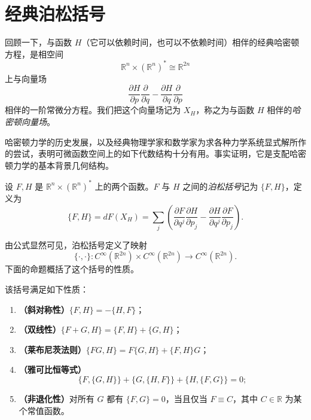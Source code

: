 \section{经典泊松括号}
\label{sec:classical-poisson-brackets}

回顾一下，与函数 $H$（它可以依赖时间，也可以不依赖时间）相伴的经典哈密顿方程，是相空间
\[
  \mathbb R^n\times(\mathbb R^n)^*\cong\mathbb R^{2n}
\]
上与向量场
\[
  \frac{\partial H}{\partial p}\frac{\partial}{\partial q}
  -\frac{\partial H}{\partial q}\frac{\partial}{\partial p}
\]
相伴的一阶常微分方程。我们把这个向量场记为 $X_H$，称之为与函数 $H$ 相伴的\emph{哈密顿向量场}。

哈密顿力学的历史发展，以及经典物理学家和数学家为求各种力学系统显式解所作的尝试，表明可微函数空间上的如下代数结构十分有用。事实证明，它是支配哈密顿力学的基本背景几何结构。

\begin{definition}[经典泊松括号]
\label{def:classical-poisson-bracket}
设 $F,H$ 是 $\mathbb R^n\times(\mathbb R^n)^*$ 上的两个函数。$F$ 与 $H$ 之间的\emph{泊松括号}记为 $\{F,H\}$，定义为
\begin{equation}\label{eq:classical-poisson-bracket}
  \{F,H\}=dF(X_H)
  =\sum_j\left(
    \frac{\partial F}{\partial q^j}\frac{\partial H}{\partial p_j}
    -\frac{\partial H}{\partial q^j}\frac{\partial F}{\partial p_j}
  \right).
\end{equation}
\end{definition}

由公式显然可见，泊松括号定义了映射
\[
  \{\cdot,\cdot\}:C^\infty(\mathbb R^{2n})\times C^\infty(\mathbb R^{2n})
  \longrightarrow C^\infty(\mathbb R^{2n}).
\]
下面的命题概括了这个括号的性质。

\begin{proposition}
\label{prop:poisson-bracket-properties}
该括号满足如下性质：
\begin{enumerate}[label=(\arabic*)]
  \item \textup{\bfseries（斜对称性）}$\{F,H\}=-\{H,F\}$；
  \item \textup{\bfseries（双线性）}$\{F+G,H\}=\{F,H\}+\{G,H\}$；
  \item \textup{\bfseries（莱布尼茨法则）}$\{FG,H\}=F\{G,H\}+\{F,H\}G$；
  \item \textup{\bfseries（雅可比恒等式）}
  \[
    \{F,\{G,H\}\}+\{G,\{H,F\}\}+\{H,\{F,G\}\}=0;
  \]
  \item \textup{\bfseries（非退化性）}对所有 $G$ 都有 $\{F,G\}=0$，当且仅当 $F\equiv C$，其中 $C\in\mathbb R$ 为某个常值函数。
\end{enumerate}
\end{proposition}

